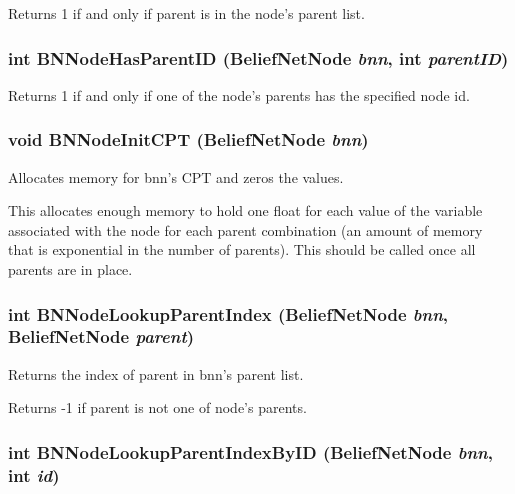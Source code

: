 Returns 1 if and only if parent is in the node's parent list. 

\subsubsection{\setlength{\rightskip}{0pt plus 5cm}int BNNode\-Has\-Parent\-ID ({\bf Belief\-Net\-Node} {\em bnn}, int {\em parent\-ID})}\label{BeliefNet_8h_a18}


Returns 1 if and only if one of the node's parents has the specified node id. 

\subsubsection{\setlength{\rightskip}{0pt plus 5cm}void BNNode\-Init\-CPT ({\bf Belief\-Net\-Node} {\em bnn})}\label{BeliefNet_8h_a25}


Allocates memory for bnn's CPT and zeros the values. 

This allocates enough memory to hold one float for each value of the variable associated with the node for each parent combination (an amount of memory that is exponential in the number of parents). This should be called once all parents are in place. 
\subsubsection{\setlength{\rightskip}{0pt plus 5cm}int BNNode\-Lookup\-Parent\-Index ({\bf Belief\-Net\-Node} {\em bnn}, {\bf Belief\-Net\-Node} {\em parent})}\label{BeliefNet_8h_a10}


Returns the index of parent in bnn's parent list. 

Returns -1 if parent is not one of node's parents. 
\subsubsection{\setlength{\rightskip}{0pt plus 5cm}int BNNode\-Lookup\-Parent\-Index\-By\-ID ({\bf Belief\-Net\-Node} {\em bnn}, int {\em id})}\label{BeliefNet_8h_a11}


